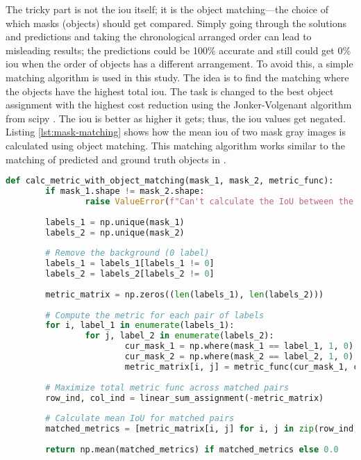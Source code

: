 		The tricky part is not the \ac{iou} itself; it is the object matching—the choice of which masks (objects) should get compared. Simply going through the solutions and predictions and taking the chronological arranged order can lead to misleading results; the predictions could be 100\% accurate and still could get 0\% \ac{iou} when the order of objects has a different arrangement. To avoid this, a simple matching algorithm is used in this study. The idea is to find the matching where the objects have the highest total \ac{iou}. The task is changed to the best object assignment with the highest cost reduction using the Jonker-Volgenant algorithm \cite{Jonker1987} from scipy \cite{scipy}. The \ac{iou} is better as higher it gets; thus, the \ac{iou} values get negated. Listing \ref{lst:mask-matching} shows how the mean \ac{iou} of two mask gray images is calculated using object matching. This matching algorithm works similar to the matching of predicted and ground truth objects in \cite{Xiang2021}.
		\begin{lstlisting}[language=Python,caption=Calculate the mean \acl{iou} between two mask images using mask matching, label=lst:mask-matching]
def calc_metric_with_object_matching(mask_1, mask_2, metric_func):
		if mask_1.shape != mask_2.shape:
				raise ValueError(f"Can't calculate the IoU between the 2 masks because of different shapes: {mask_1.shape} and {mask_2.shape}")
		
		labels_1 = np.unique(mask_1)
		labels_2 = np.unique(mask_2)
		
		# Remove the background (0 label)
		labels_1 = labels_1[labels_1 != 0]
		labels_2 = labels_2[labels_2 != 0]
		
		metric_matrix = np.zeros((len(labels_1), len(labels_2)))
		
		# Compute the metric for each pair of labels
		for i, label_1 in enumerate(labels_1):
				for j, label_2 in enumerate(labels_2):
						cur_mask_1 = np.where(mask_1 == label_1, 1, 0)
						cur_mask_2 = np.where(mask_2 == label_2, 1, 0)
						metric_matrix[i, j] = metric_func(cur_mask_1, cur_mask_2)
		
		# Maximize total metric func across matched pairs
		row_ind, col_ind = linear_sum_assignment(-metric_matrix)
		
		# Calculate mean IoU for matched pairs
		matched_metrics = [metric_matrix[i, j] for i, j in zip(row_ind, 
																																	col_ind)]
		return np.mean(matched_metrics) if matched_metrics else 0.0
		\end{lstlisting}
		
